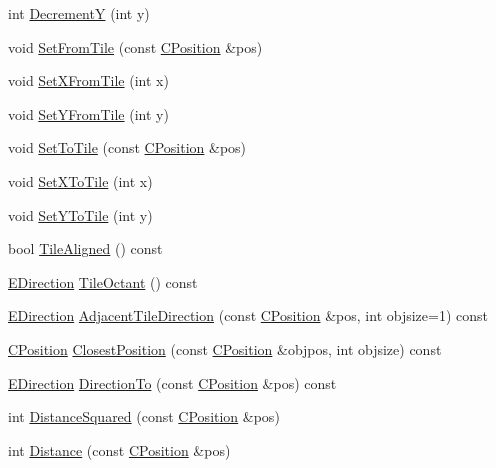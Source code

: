 \begin{DoxyCompactItemize}
\item 
int \hyperlink{classCPosition_a51ee44d9e0457d6277567fd8a66fdec7}{DecrementY} (int y)
\item 
void \hyperlink{classCPosition_a46994e6a8b8e3b4237edd7259ad844b6}{Set\+From\+Tile} (const \hyperlink{classCPosition}{C\+Position} \&pos)
\item 
void \hyperlink{classCPosition_ac6a1eeaeb98e20942efea7cf253b2ec4}{Set\+X\+From\+Tile} (int x)
\item 
void \hyperlink{classCPosition_a4be1caa5ce58297e9d371f6bc1db32d9}{Set\+Y\+From\+Tile} (int y)
\item 
void \hyperlink{classCPosition_ae302aa21792de64c97de29e2cbbfeb94}{Set\+To\+Tile} (const \hyperlink{classCPosition}{C\+Position} \&pos)
\item 
void \hyperlink{classCPosition_a12795d06d34e608697b7b4c9bf202a10}{Set\+X\+To\+Tile} (int x)
\item 
void \hyperlink{classCPosition_a5805485f623398197ac595a5d389f691}{Set\+Y\+To\+Tile} (int y)
\item 
bool \hyperlink{classCPosition_abe4ef039d9bbf51cd542167b5a0cd88e}{Tile\+Aligned} () const
\item 
\hyperlink{GameDataTypes_8h_acb2b033915f6659a71a38b5aa6e4eb42}{E\+Direction} \hyperlink{classCPosition_a6acbc9445751b0a040c2971720f00088}{Tile\+Octant} () const
\item 
\hyperlink{GameDataTypes_8h_acb2b033915f6659a71a38b5aa6e4eb42}{E\+Direction} \hyperlink{classCPosition_a2295901e4c35cfc81304f9a217e34ac7}{Adjacent\+Tile\+Direction} (const \hyperlink{classCPosition}{C\+Position} \&pos, int objsize=1) const
\item 
\hyperlink{classCPosition}{C\+Position} \hyperlink{classCPosition_a91fd43eeb2c894bcb7577ae87247b726}{Closest\+Position} (const \hyperlink{classCPosition}{C\+Position} \&objpos, int objsize) const
\item 
\hyperlink{GameDataTypes_8h_acb2b033915f6659a71a38b5aa6e4eb42}{E\+Direction} \hyperlink{classCPosition_a65124e3543c2d2e284e5eb517cd7f842}{Direction\+To} (const \hyperlink{classCPosition}{C\+Position} \&pos) const
\item 
int \hyperlink{classCPosition_acd96d507f44c0fdf13036ebc1a09e59c}{Distance\+Squared} (const \hyperlink{classCPosition}{C\+Position} \&pos)
\item 
int \hyperlink{classCPosition_a9edc6690c78a54ea08b137df83c22e91}{Distance} (const \hyperlink{classCPosition}{C\+Position} \&pos)
\end{DoxyCompactItemize}
